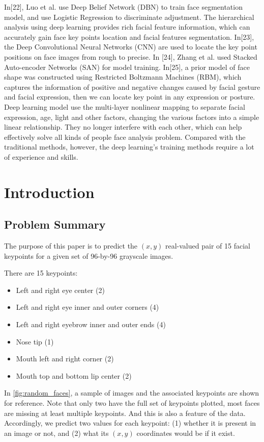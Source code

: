 \documentclass{article}
\begin{document}
In[22], Luo et al. use Deep Belief Network (DBN) to train face segmentation model, and use Logistic Regression to discriminate adjustment. The hierarchical analysis using deep learning provides rich facial feature information, which can accurately gain face key points location and facial features segmentation. In[23], the Deep Convolutional Neural Networks (CNN) are used to locate the key point positions on face images from rough to precise. In [24], Zhang et al. used Stacked Auto-encoder Networks (SAN) for model training. In[25], a prior model of face shape was constructed using Restricted Boltzmann Machines (RBM), which captures the information of positive and negative changes caused by facial gesture and facial expression, then we can locate key point in any expression or posture. 
Deep learning model use the multi-layer nonlinear mapping to separate facial expression,  age, light and other factors, changing the various factors into a simple linear relationship. They no longer interfere with each other, which can help effectively solve all kinds of people face analysis problem. Compared with the traditional methods, however, the deep learning's training methods require a lot of experience and skills.
\section{Introduction}
\subsection{Problem Summary}

The purpose of this paper is to predict the $(x,y)$ real-valued pair of 15 facial keypoints for a given set of 96-by-96 grayscale images. 

There are 15 keypoints:
\begin{itemize}
\item Left and right eye center (2)
\item Left and right eye inner and outer corners (4)
\item Left and right eyebrow inner and outer ends (4)
\item Nose tip (1)
\item Mouth left and right corner (2)
\item Mouth top and bottom lip center (2)
\end{itemize}
In \ref{fig:random_faces}, a sample of images and the associated keypoints are shown for reference. Note that only two have the full set of keypoints plotted, most faces are missing at least multiple keypoints. And this is also a feature of the data. Accordingly, we predict two values for each keypoint: (1) whether it is present in an image or not, and (2) what its $(x,y)$ coordinates would be if it exist.
\end{document}
